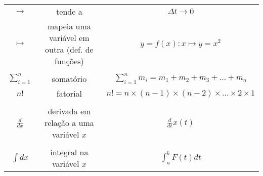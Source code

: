 \begin{table*}[!ht]
\begin{tabular}{ccc}
$\to$ & tende a & $\Delta t \to 0$ \\
$\mapsto$ & mapeia uma variável em outra (def. de funções) & $y=f(x): x\mapsto y=x^2$ \\
\\
$\sum_{i=1}^n$ & somatório & $\sum_{i=1}^{n} m_i = m_1 + m_2 + m_3 + \dots + m_n$ \\
$n!$ & fatorial & $n! = n \times (n-1) \times (n-2) \times \dots \times 2 \times 1$ \\
\\
$\frac{d}{dx}$ & derivada em relação a uma variável $x$ & $\frac{d}{dt} x(t)$ \\
\\
$\int dx$ & integral na variável $x$ & $\int_a^b F(t)dt$ \\
\bottomrule
\end{tabular}
\end{table*}

\hfill
\pagebreak
